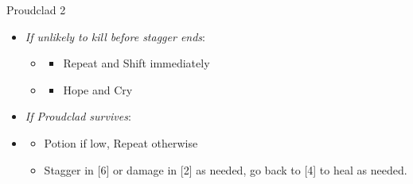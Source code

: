 \begin{battle}[2:01]{Proudclad 2}
\begin{itemize}
			\item \textit{If unlikely to kill before stagger ends}:
			      \begin{itemize}
				      \item \first
				            \begin{itemize}
					            \item Repeat and Shift immediately
				            \end{itemize}
				      \item \second
				            \begin{itemize}
					            \item Hope and Cry
				            \end{itemize}
			      \end{itemize}
			\item \textit{If Proudclad survives}:
			\item \fourth
			      \begin{itemize}
				      \item Potion if low, Repeat otherwise
				      \item Stagger in [6] or damage in [2] as needed, go back to [4] to heal as needed.
			      \end{itemize}
		\end{itemize}
\end{battle}
\vfill
\ 
\columnbreak